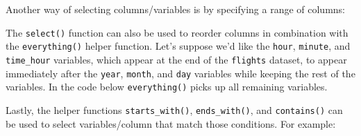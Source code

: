 \documentclass[12pt, krantz2,]{krantz}
\makeatletter
\newenvironment{Shaded}{\begin{snugshade}}{\end{snugshade}}
\newcommand{\KeywordTok}[1]{\textcolor[rgb]{0.27,0.27,0.27}{\textbf{#1}}}
\newcommand{\NormalTok}[1]{#1}
\newcommand{\OperatorTok}[1]{\textcolor[rgb]{0.43,0.43,0.43}{\textbf{#1}}}
\newcommand{\StringTok}[1]{\textcolor[rgb]{0.5,0.5,0.5}{#1}}
\newenvironment{kframe}{%
\medskip{}
\setlength{\fboxsep}{.8em}
 \def\at@end@of@kframe{}%
 \ifinner\ifhmode%
  \def\at@end@of@kframe{\end{minipage}}%
  \begin{minipage}{\columnwidth}%
 \fi\fi%
 \def\FrameCommand##1{\hskip\@totalleftmargin \hskip-\fboxsep
 \colorbox{shadecolor}{##1}\hskip-\fboxsep
     \hskip-\linewidth \hskip-\@totalleftmargin \hskip\columnwidth}%
 \MakeFramed {\advance\hsize-\width
   \@totalleftmargin\z@ \linewidth\hsize
   \@setminipage}}%
 {\par\unskip\endMakeFramed%
 \at@end@of@kframe}
\renewenvironment{Shaded}{\begin{kframe}}{\end{kframe}}
\makeatother
\begin{document}
Another way of selecting columns/variables is by specifying a range of columns:

\begin{Shaded}
\end{Shaded}

The \texttt{select()} function can also be used to reorder columns in combination with the \texttt{everything()} helper function. Let's suppose we'd like the \texttt{hour}, \texttt{minute}, and \texttt{time\_hour} variables, which appear at the end of the \texttt{flights} dataset, to appear immediately after the \texttt{year}, \texttt{month}, and \texttt{day} variables while keeping the rest of the variables. In the code below \texttt{everything()} picks up all remaining variables.

\begin{Shaded}
\end{Shaded}

Lastly, the helper functions \texttt{starts\_with()}, \texttt{ends\_with()}, and \texttt{contains()} can be used to select variables/column that match those conditions. For example:

\begin{Shaded}
\end{Shaded}

\begin{Shaded}
\end{Shaded}
\end{document}
